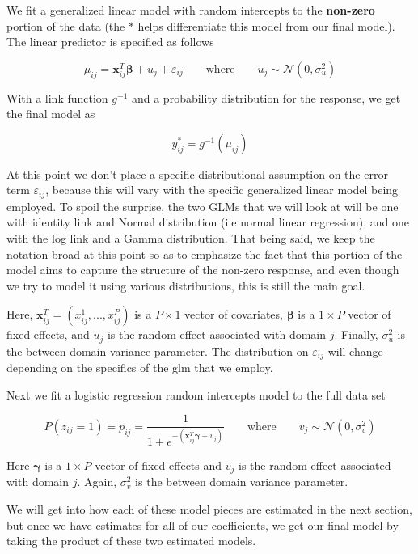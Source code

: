\documentclass[12pt,twoside]{reedthesis}
\begin{document}
We fit a generalized linear model with random intercepts to the \textbf{non-zero} portion of the data (the \(*\) helps differentiate this model from our final model). The linear predictor is specified as follows

\[
\mu_{ij} = \mathbf{x}_{ij}^T\boldsymbol{\beta} + u_j + \varepsilon_{ij} \qquad \text{where} \qquad u_j \sim \mathcal{N}(0, \sigma_{u}^2)
\]

With a link function \(g^{-1}\) and a probability distribution for the response, we get the final model as

\[
y^*_{ij} = g^{-1}(\mu_{ij})
\]

At this point we don't place a specific distributional assumption on the error term \(\varepsilon_{ij}\), because this will vary with the specific generalized linear model being employed. To spoil the surprise, the two GLMs that we will look at will be one with identity link and Normal distribution (i.e normal linear regression), and one with the log link and a Gamma distribution. That being said, we keep the notation broad at this point so as to emphasize the fact that this portion of the model aims to capture the structure of the non-zero response, and even though we try to model it using various distributions, this is still the main goal.

Here, \(\mathbf{x}_{ij}^T = (x^1_{ij}, ..., x^P_{ij})\) is a \(P\times 1\) vector of covariates, \(\boldsymbol{\beta}\) is a \(1\times P\) vector of fixed effects, and \(u_j\) is the random effect associated with domain \(j\). Finally, \(\sigma^2_{u}\) is the between domain variance parameter. The distribution on \(\varepsilon_{ij}\) will change depending on the specifics of the glm that we employ.

Next we fit a logistic regression random intercepts model to the full data set

\[
P(z_{ij} = 1) = p_{ij} = \frac{1}{1 + e^{-(\mathbf{x}_{ij}^T\boldsymbol{\gamma} + v_j)}} \qquad \text{where} \qquad v_j \sim \mathcal{N}(0, \sigma_{v}^2)
\]

Here \(\boldsymbol{\gamma}\) is a \(1\times P\) vector of fixed effects and \(v_j\) is the random effect associated with domain \(j\). Again, \(\sigma^2_{v}\) is the between domain variance parameter.

We will get into how each of these model pieces are estimated in the next section, but once we have estimates for all of our coefficients, we get our final model by taking the product of these two estimated models.
\end{document}
